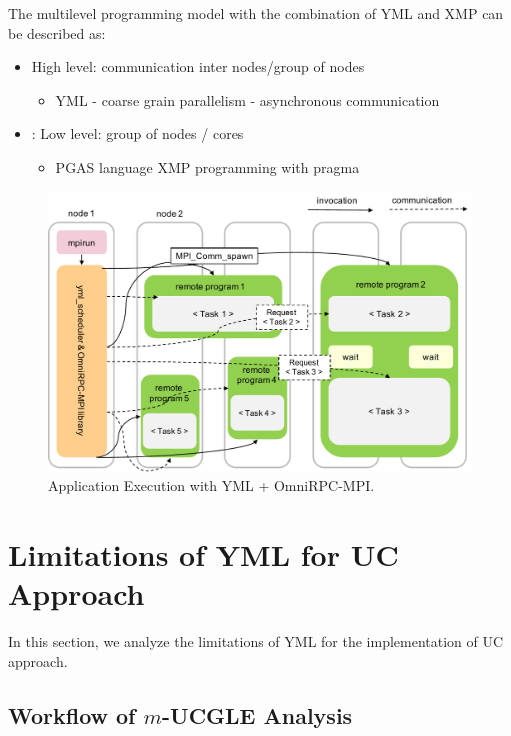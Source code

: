 The multilevel programming model with the combination of YML and XMP can be described as:

\begin{itemize}
	\item High level: communication inter nodes/group of nodes
	\begin{itemize}
		\item YML - coarse grain parallelism - asynchronous communication
	\end{itemize}
	\item: Low level: group of nodes / cores
	\begin{itemize}
			\item PGAS language XMP programming with pragma
		\end{itemize}
\end{itemize}

\begin{figure}[t]
	\centering
	\includegraphics[width=.92\linewidth]{fig/xmp-yml-exec.pdf}
	\caption{Application Execution with YML + OmniRPC-MPI.}
	\label{xmp-yml-exec}
\end{figure}


\section{Limitations of YML for UC Approach}\label{Limitations of YML for UC Approach}

In this section, we analyze the limitations of YML for the implementation of UC approach.

\subsection{Workflow of $m$-UCGLE Analysis}

